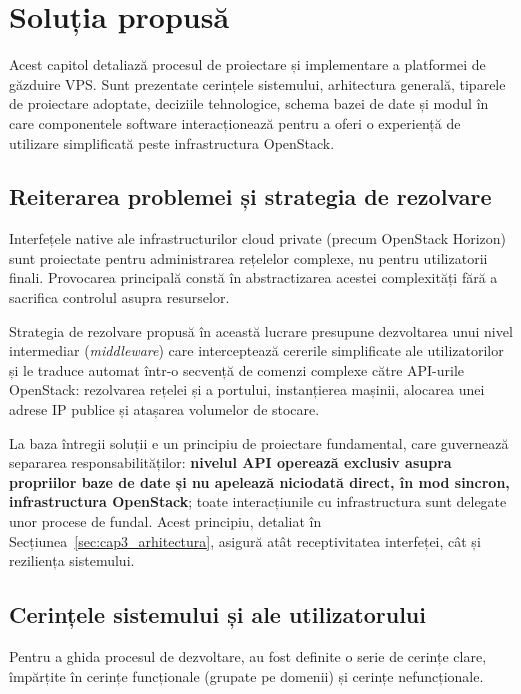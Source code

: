 \chapter{Soluția propusă}
\label{cap:cap3}

Acest capitol detaliază procesul de proiectare și implementare a platformei de găzduire VPS. Sunt prezentate cerințele sistemului, arhitectura generală, tiparele de proiectare adoptate, deciziile tehnologice, schema bazei de date și modul în care componentele software interacționează pentru a oferi o experiență de utilizare simplificată peste infrastructura OpenStack.

\section{Reiterarea problemei și strategia de rezolvare}
\label{sec:cap3_problema}

Interfețele native ale infrastructurilor cloud private (precum OpenStack Horizon) sunt proiectate pentru administrarea rețelelor complexe, nu pentru utilizatorii finali. Provocarea principală constă în abstractizarea acestei complexități fără a sacrifica controlul asupra resurselor.

Strategia de rezolvare propusă în această lucrare presupune dezvoltarea unui nivel intermediar (\textit{middleware}) care interceptează cererile simplificate ale utilizatorilor și le traduce automat într-o secvență de comenzi complexe către API-urile OpenStack: rezolvarea rețelei și a portului, instanțierea mașinii, alocarea unei adrese IP publice și atașarea volumelor de stocare.

La baza întregii soluții e un principiu de proiectare fundamental, care guvernează separarea responsabilităților: \textbf{nivelul API operează exclusiv asupra propriilor baze de date și nu apelează niciodată direct, în mod sincron, infrastructura OpenStack}; toate interacțiunile cu infrastructura sunt delegate unor procese de fundal. Acest principiu, detaliat în Secțiunea~\ref{sec:cap3_arhitectura}, asigură atât receptivitatea interfeței, cât și reziliența sistemului.

\section{Cerințele sistemului și ale utilizatorului}
\label{sec:cap3_cerinte}

Pentru a ghida procesul de dezvoltare, au fost definite o serie de cerințe clare, împărțite în cerințe funcționale (grupate pe domenii) și cerințe nefuncționale.

